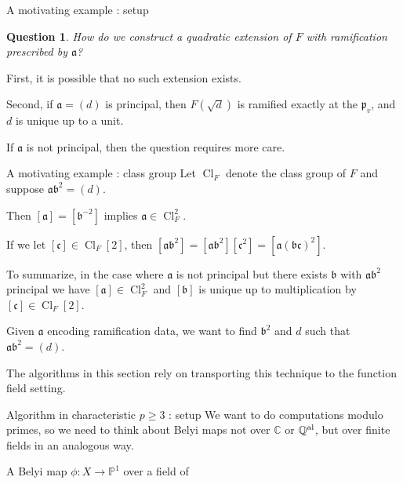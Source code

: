 \documentclass[xcolor=dvipsnames]{beamer}
\theoremstyle{plain}
\newtheorem*{ques}{Question}
\newcommand{\PP}{\mathbb P}
\newcommand{\CC}{\mathbb C}
\newcommand{\QQal}{{\mathbb Q}^{\textup{al}}}
\DeclareMathOperator{\Cl}{Cl}
\begin{document}
{\begin{frame}{A motivating example : setup}
      \pause\par
      \begin{ques}
        \vspace{1pt}
        How do we construct a quadratic extension of $F$
        with ramification prescribed by $\mathfrak{a}$?
      \end{ques}
      \pause
      First, it is possible that no such extension exists.
      \pause\par
      Second, if $\mathfrak{a}=(d)$ is principal,
      then $F(\sqrt{d})$ is ramified exactly at
      the $\mathfrak{p}_v$, and $d$ is unique up
      to a unit.
      \pause\par
      If $\mathfrak{a}$ is not principal,
      then the question requires more care.
    \end{frame}
    \begin{frame}{A motivating example : class group}
      Let $\Cl_F$ denote the class group of $F$
      and suppose $\mathfrak{a}\mathfrak{b}^2=(d)$.
      \pause\par
      Then
      $[\mathfrak{a}]=[\mathfrak{b}^{-2}]$
      implies $\mathfrak{a}\in\Cl_F^2$.
      \pause\par
      If we let $[\mathfrak{c}]\in\Cl_F[2]$,
      then
      $[\mathfrak{a}\mathfrak{b}^2]
        =[\mathfrak{a}\mathfrak{b}^2][\mathfrak{c}^2]
        =[\mathfrak{a}(\mathfrak{b}\mathfrak{c})^2]$.
      \pause\par
      To summarize,
      in the case where $\mathfrak{a}$ is not principal
      but there exists $\mathfrak{b}$ with
      $\mathfrak{a}\mathfrak{b}^2$ principal
      we have
      $[\mathfrak{a}]\in\Cl_F^2$
      and $[\mathfrak{b}]$ is unique
      up to multiplication by
      $[\mathfrak{c}]\in\Cl_F[2]$.
      \pause\par
      Given $\mathfrak{a}$ encoding ramification data,
      we want to find $\mathfrak{b}^2$ and $d$
      such that $\mathfrak{a}\mathfrak{b}^2=(d)$.
      \pause\par
      The algorithms in this section
      rely on transporting this technique
      to the function field setting.
    \end{frame}
    \begin{frame}{Algorithm in characteristic $p\geq 3$ : setup}
      We want to do computations modulo primes,
      so we need to think about Belyi maps not over
      $\CC$ or $\QQal$, but over finite fields in
      an analogous way.
      \pause\par
      A Belyi map $\phi\colon X\to\PP^1$ over a field of

\end{frame}}
\end{document}
